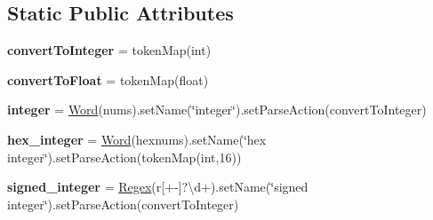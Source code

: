 \subsection*{Static Public Attributes}
\begin{DoxyCompactItemize}
\item 
\mbox{\label{classpkg__resources_1_1__vendor_1_1pyparsing_1_1pyparsing__common_a80507d659f442dfdf70bb7a6ca9367cc}} 
{\bfseries convert\+To\+Integer} = token\+Map(int)
\item 
\mbox{\label{classpkg__resources_1_1__vendor_1_1pyparsing_1_1pyparsing__common_ad378a8815eb2191c7c8f481db0fb941f}} 
{\bfseries convert\+To\+Float} = token\+Map(float)
\item 
\mbox{\label{classpkg__resources_1_1__vendor_1_1pyparsing_1_1pyparsing__common_ae130be28250aa3e676d778625aefa220}} 
{\bfseries integer} = \hyperlink{classpkg__resources_1_1__vendor_1_1pyparsing_1_1_word}{Word}(nums).set\+Name(\char`\"{}integer\char`\"{}).set\+Parse\+Action(convert\+To\+Integer)
\item 
\mbox{\label{classpkg__resources_1_1__vendor_1_1pyparsing_1_1pyparsing__common_a4b268e724d45ac50d841dde6d263a27d}} 
{\bfseries hex\+\_\+integer} = \hyperlink{classpkg__resources_1_1__vendor_1_1pyparsing_1_1_word}{Word}(hexnums).set\+Name(\char`\"{}hex integer\char`\"{}).set\+Parse\+Action(token\+Map(int,16))
\item 
\mbox{\label{classpkg__resources_1_1__vendor_1_1pyparsing_1_1pyparsing__common_a3894306858ef8b216899a8ca5d2a1714}} 
{\bfseries signed\+\_\+integer} = \hyperlink{classpkg__resources_1_1__vendor_1_1pyparsing_1_1_regex}{Regex}(r\textquotesingle{}\mbox{[}+-\/\mbox{]}?\textbackslash{}d+\textquotesingle{}).set\+Name(\char`\"{}signed integer\char`\"{}).set\+Parse\+Action(convert\+To\+Integer)
\item 
\mbox{\label{classpkg__resources_1_1__vendor_1_1pyparsing_1_1pyparsing__common_a7e13c254c5258ecfc4a51c8cd2dcb311}} 

\end{DoxyCompactItemize}
